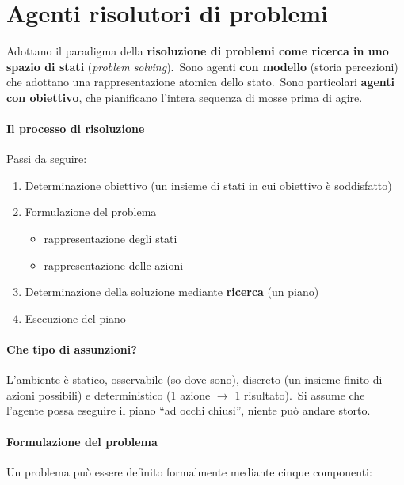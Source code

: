 \chapter{Agenti risolutori di problemi}
Adottano il paradigma della \textbf{risoluzione di problemi come ricerca in uno spazio di stati} (\textit{problem solving}).\
Sono agenti \textbf{con modello} (storia percezioni) che adottano una rappresentazione atomica dello stato.\
Sono particolari \textbf{agenti con obiettivo}, che pianificano l'intera sequenza di mosse prima di agire.

\subsubsection{Il processo di risoluzione}
Passi da seguire:
\begin{enumerate}
	\item Determinazione obiettivo (un insieme di stati in cui obiettivo è soddisfatto)
	\item  Formulazione del problema
	      \begin{itemize}
		      \item rappresentazione degli stati
		      \item rappresentazione delle azioni
	      \end{itemize}
	\item Determinazione della soluzione mediante \textbf{ricerca} (un piano)
	\item Esecuzione del piano
\end{enumerate}

\subsubsection{Che tipo di assunzioni?}
L'ambiente è statico, osservabile (so dove sono), discreto (un insieme finito di azioni possibili) e deterministico (1 azione $\rightarrow$ 1 risultato).\
Si assume che l'agente possa eseguire il piano ``ad occhi
chiusi'', niente può andare storto.

\subsubsection{Formulazione del problema}
Un problema può essere definito formalmente mediante cinque componenti:

